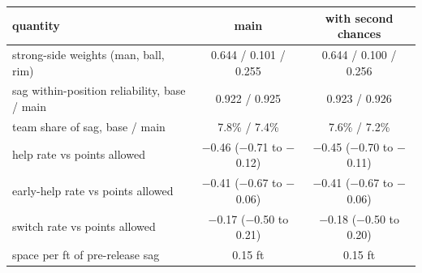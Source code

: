 \begin{tabular}{lcc}
\hline
quantity & main & with second chances \\
\hline
strong-side weights (man, ball, rim) & 0.644 / 0.101 / 0.255 & 0.644 / 0.100 / 0.256 \\
sag within-position reliability, base / main & 0.922 / 0.925 & 0.923 / 0.926 \\
team share of sag, base / main & 7.8\% / 7.4\% & 7.6\% / 7.2\% \\
help rate vs points allowed & $-$0.46 ($-$0.71 to $-$0.12) & $-$0.45 ($-$0.70 to $-$0.11) \\
early-help rate vs points allowed & $-$0.41 ($-$0.67 to $-$0.06) & $-$0.41 ($-$0.67 to $-$0.06) \\
switch rate vs points allowed & $-$0.17 ($-$0.50 to 0.21) & $-$0.18 ($-$0.50 to 0.20) \\
space per ft of pre-release sag & 0.15 ft & 0.15 ft \\
\hline
\end{tabular}
